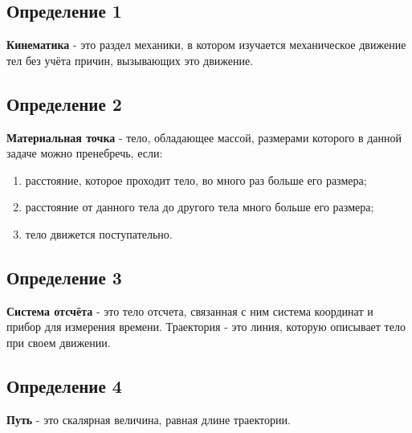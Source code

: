 \documentclass[a4paper,12pt]{article}
\begin{document}
\begin{center}
\end{center}

\subsection*{Определение 1}
\vspace{-3pt}
\textbf{Кинематика} - это раздел механики, в котором изучается механическое движение тел без учёта причин, вызывающих это движение.

\vspace{-10pt}

\subsection*{Определение 2}
\vspace{-3pt}
\textbf{Материальная точка} - тело, обладающее массой, размерами которого в данной задаче можно пренебречь, если:
\begin{enumerate}[itemsep=0pt, topsep=0pt, parsep=3pt]
    \item расстояние, которое проходит тело, во много раз больше его размера;
    \item расстояние от данного тела до другого тела много больше его размера;
    \item тело движется поступательно.
\end{enumerate}

\vspace{-10pt}

\subsection*{Определение 3}
\vspace{-3pt}
\textbf{Система отсчёта} - это тело отсчета, связанная с ним система координат и прибор для измерения времени. Траектория - это линия, которую описывает тело при своем движении.

\vspace{-10pt}

\subsection*{Определение 4}
\vspace{-3pt}
\textbf{Путь} - это скалярная величина, равная длине траектории.   

\vspace{-10pt}
\end{document}
